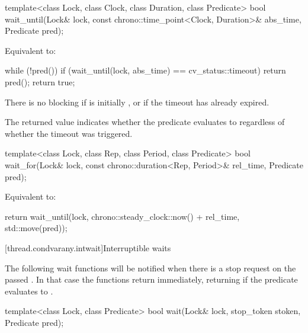 %
\begin{itemdecl}
template<class Lock, class Clock, class Duration, class Predicate>
  bool wait_until(Lock& lock, const chrono::time_point<Clock, Duration>& abs_time, Predicate pred);
\end{itemdecl}

\begin{itemdescr}
\pnum
\effects
Equivalent to:
\begin{codeblock}
while (!pred())
  if (wait_until(lock, abs_time) == cv_status::timeout)
    return pred();
return true;
\end{codeblock}

\pnum
\begin{note}
There is no blocking if  is initially , or
if the timeout has already expired.
\end{note}

\pnum
\begin{note}
The returned value indicates whether the predicate evaluates to 
regardless of whether the timeout was triggered.
\end{note}
\end{itemdescr}

%
\begin{itemdecl}
template<class Lock, class Rep, class Period, class Predicate>
  bool wait_for(Lock& lock, const chrono::duration<Rep, Period>& rel_time, Predicate pred);
\end{itemdecl}

\begin{itemdescr}
\pnum
\effects
Equivalent to:
\begin{codeblock}
return wait_until(lock, chrono::steady_clock::now() + rel_time, std::move(pred));
\end{codeblock}
\end{itemdescr}

[thread.condvarany.intwait]{Interruptible waits}

\pnum
The following wait functions will be notified
when there is a stop request on the passed .
In that case the functions return immediately,
returning  if the predicate evaluates to .

\begin{itemdecl}
template<class Lock, class Predicate>
  bool wait(Lock& lock, stop_token stoken, Predicate pred);
\end{itemdecl}

